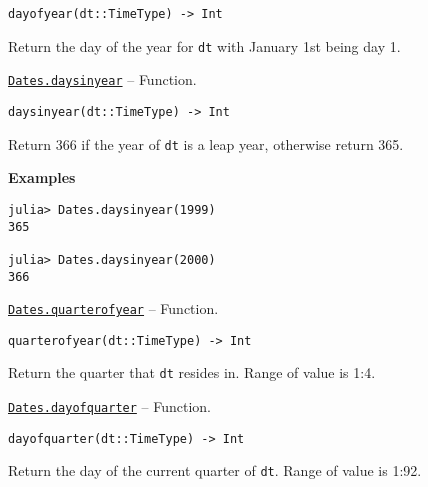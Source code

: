 \begin{adjustwidth}{2em}{0pt}


\begin{verbatim}
dayofyear(dt::TimeType) -> Int
\end{verbatim}

Return the day of the year for \texttt{dt} with January 1st being day 1.



\end{adjustwidth}
\hypertarget{11086128603918251845}{} 
\hyperlink{11086128603918251845}{\texttt{Dates.daysinyear}}  -- {Function.}

\begin{adjustwidth}{2em}{0pt}


\begin{verbatim}
daysinyear(dt::TimeType) -> Int
\end{verbatim}

Return 366 if the year of \texttt{dt} is a leap year, otherwise return 365.

\textbf{Examples}


\begin{verbatim}
julia> Dates.daysinyear(1999)
365

julia> Dates.daysinyear(2000)
366
\end{verbatim}



\end{adjustwidth}
\hypertarget{6690591772267933900}{} 
\hyperlink{6690591772267933900}{\texttt{Dates.quarterofyear}}  -- {Function.}

\begin{adjustwidth}{2em}{0pt}


\begin{verbatim}
quarterofyear(dt::TimeType) -> Int
\end{verbatim}

Return the quarter that \texttt{dt} resides in. Range of value is 1:4.



\end{adjustwidth}
\hypertarget{10496844318360486693}{} 
\hyperlink{10496844318360486693}{\texttt{Dates.dayofquarter}}  -- {Function.}

\begin{adjustwidth}{2em}{0pt}


\begin{verbatim}
dayofquarter(dt::TimeType) -> Int
\end{verbatim}

Return the day of the current quarter of \texttt{dt}. Range of value is 1:92.



\end{adjustwidth}

